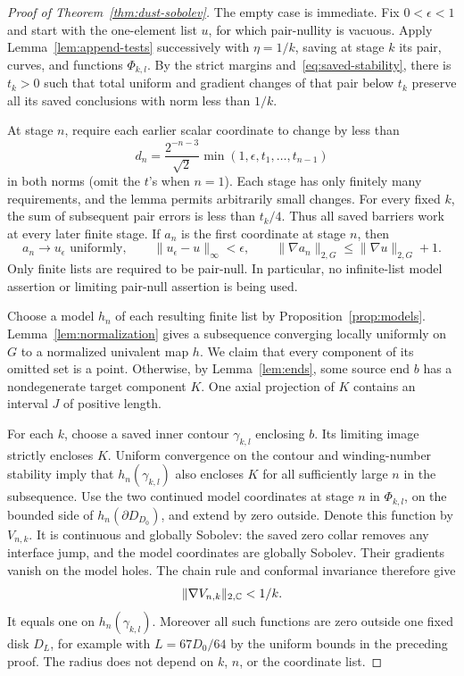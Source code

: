 \begin{proof}[Proof of Theorem~\ref{thm:dust-sobolev}]
The empty case is immediate.  Fix $0<\epsilon<1$ and start with the
one-element list $u$, for which pair-nullity is vacuous.  Apply
Lemma~\ref{lem:append-tests} successively with $\eta=1/k$, saving at
stage $k$ its pair, curves, and functions $\Phi_{k,l}$.  By the strict
margins and~\eqref{eq:saved-stability}, there is $t_k>0$ such that total
uniform and gradient changes of that pair below $t_k$ preserve all its
saved conclusions with norm less than $1/k$.

At stage $n$, require each earlier scalar coordinate to change by less
than
\[
 d_n=\frac{2^{-n-3}}{\sqrt2}
       \min(1,\epsilon,t_1,\ldots,t_{n-1})
\]
in both norms (omit the $t$'s when $n=1$).  Each stage has only finitely
many requirements, and the lemma permits arbitrarily small changes.
For every fixed $k$, the sum of subsequent pair errors is less than
$t_k/4$.  Thus all saved barriers work at every later finite stage.
If $a_n$ is the first coordinate at stage $n$, then
\begin{equation}\label{eq:first-test-control}
 a_n\longrightarrow u_\epsilon\text{ uniformly},\qquad
 \|u_\epsilon-u\|_\infty<\epsilon,\qquad
 \|\nabla a_n\|_{2,G}\le\|\nabla u\|_{2,G}+1.
\end{equation}
Only finite lists are required to be pair-null.  In particular, no
infinite-list model assertion or limiting pair-null assertion is being
used.

Choose a model $h_n$ of each resulting finite list by
Proposition~\ref{prop:models}.  Lemma~\ref{lem:normalization} gives a
subsequence converging locally uniformly on $G$ to a normalized
univalent map $h$.  We claim that every component of its omitted set is
a point.  Otherwise, by Lemma~\ref{lem:ends}, some source end $b$ has
a nondegenerate target component $K$.  One axial projection of $K$
contains an interval $J$ of positive length.

For each $k$, choose a saved inner contour $\gamma_{k,l}$ enclosing
$b$.  Its limiting image strictly encloses $K$.  Uniform convergence
on the contour and winding-number stability imply that
$h_n(\gamma_{k,l})$ also encloses $K$ for all sufficiently large $n$
in the subsequence.  Use the two continued model coordinates at stage
$n$ in $\Phi_{k,l}$, on the bounded side of
$h_n(\partial D_{D_0})$, and extend by zero outside.  Denote this
function by $V_{n,k}$.  It is continuous and globally Sobolev: the
saved zero collar removes any interface jump, and the model
coordinates are globally Sobolev.  Their gradients vanish on the
model holes.  The chain rule and conformal invariance therefore give
\begin{equation}\label{eq:vanishing-barrier-energy}
 \|\nabla V_{n,k}\|_{2,\mathbb C}<1/k.
\end{equation}
It equals one on $h_n(\gamma_{k,l})$.  Moreover all such functions are
zero outside one fixed disk $D_L$, for example with $L=67D_0/64$ by
the uniform bounds in the preceding proof.  The radius does not depend
on $k$, $n$, or the coordinate list.


\end{proof}
